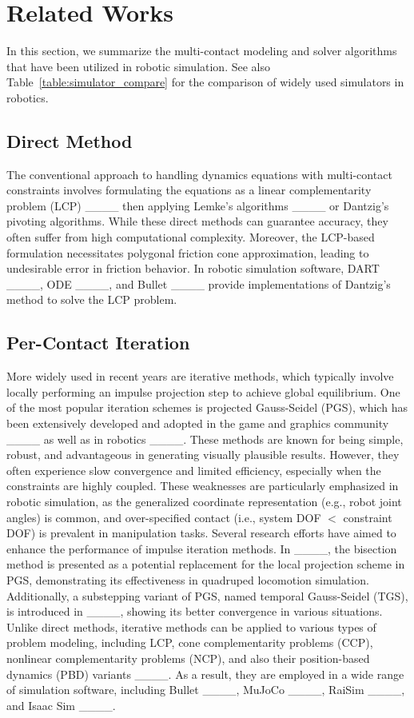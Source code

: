 \section{Related Works}
\label{sec:relatedworks}

In this section, we summarize the multi-contact modeling and solver algorithms that have been utilized in robotic simulation. See also Table~\ref{table:simulator_compare} for the comparison of widely used simulators in robotics.

\subsection{Direct Method}
The conventional approach to handling dynamics equations with multi-contact constraints involves formulating the equations as a linear complementarity problem (LCP) ____ then applying Lemke's algorithms ____ or Dantzig's pivoting algorithms. 
While these direct methods can guarantee accuracy, they often suffer from high computational complexity. Moreover, the LCP-based formulation necessitates polygonal friction cone approximation, leading to undesirable error in friction behavior. 
In robotic simulation software, DART ____, ODE ____, and Bullet ____ provide implementations of Dantzig's method to solve the LCP problem.

\subsection{Per-Contact Iteration}

More widely used in recent years are iterative methods, which typically involve locally performing an impulse projection step to achieve global equilibrium. 
One of the most popular iteration schemes is projected Gauss-Seidel (PGS), which has been extensively developed and adopted in the game and graphics community ____ as well as in robotics ____. 
These methods are known for being simple, robust, and advantageous in generating visually plausible results. 
However, they often experience slow convergence and limited efficiency, especially when the constraints are highly coupled. 
These weaknesses are particularly emphasized in robotic simulation, as the generalized coordinate representation (e.g., robot joint angles) is common, and over-specified contact (i.e., system DOF $<$ constraint DOF) is prevalent in manipulation tasks.
Several research efforts have aimed to enhance the performance of impulse iteration methods. In ____, the bisection method is presented as a potential replacement for the local projection scheme in PGS, demonstrating its effectiveness in quadruped locomotion simulation. Additionally, a substepping variant of PGS, named temporal Gauss-Seidel (TGS), is introduced in ____, showing its better convergence in various situations.
Unlike direct methods, iterative methods can be applied to various types of problem modeling, including LCP, cone complementarity problems (CCP), nonlinear complementarity problems (NCP), and also their position-based dynamics (PBD) variants ____. 
As a result, they are employed in a wide range of simulation software, including Bullet ____, MuJoCo ____, RaiSim ____, and Isaac Sim ____.

